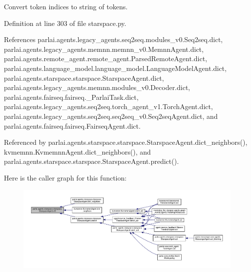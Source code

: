 \begin{DoxyVerb}Convert token indices to string of tokens.\end{DoxyVerb}
 

Definition at line 303 of file starspace.\+py.



References parlai.\+agents.\+legacy\+\_\+agents.\+seq2seq.\+modules\+\_\+v0.\+Seq2seq.\+dict, parlai.\+agents.\+legacy\+\_\+agents.\+memnn.\+memnn\+\_\+v0.\+Memnn\+Agent.\+dict, parlai.\+agents.\+remote\+\_\+agent.\+remote\+\_\+agent.\+Parsed\+Remote\+Agent.\+dict, parlai.\+agents.\+language\+\_\+model.\+language\+\_\+model.\+Language\+Model\+Agent.\+dict, parlai.\+agents.\+starspace.\+starspace.\+Starspace\+Agent.\+dict, parlai.\+agents.\+legacy\+\_\+agents.\+memnn.\+modules\+\_\+v0.\+Decoder.\+dict, parlai.\+agents.\+fairseq.\+fairseq.\+\_\+\+Parlai\+Task.\+dict, parlai.\+agents.\+legacy\+\_\+agents.\+seq2seq.\+torch\+\_\+agent\+\_\+v1.\+Torch\+Agent.\+dict, parlai.\+agents.\+legacy\+\_\+agents.\+seq2seq.\+seq2seq\+\_\+v0.\+Seq2seq\+Agent.\+dict, and parlai.\+agents.\+fairseq.\+fairseq.\+Fairseq\+Agent.\+dict.



Referenced by parlai.\+agents.\+starspace.\+starspace.\+Starspace\+Agent.\+dict\+\_\+neighbors(), kvmemnn.\+Kvmemnn\+Agent.\+dict\+\_\+neighbors(), and parlai.\+agents.\+starspace.\+starspace.\+Starspace\+Agent.\+predict().

Here is the caller graph for this function\+:
\nopagebreak
\begin{figure}[H]
\begin{center}
\leavevmode
\includegraphics[width=350pt]{classparlai_1_1agents_1_1starspace_1_1starspace_1_1StarspaceAgent_a070074c4396b7ea6edc56e190e0c011f_icgraph}
\end{center}
\end{figure}
\mbox{\label{classparlai_1_1agents_1_1starspace_1_1starspace_1_1StarspaceAgent_a87253cca09c8b22848ff0bea7195e32d}} 
